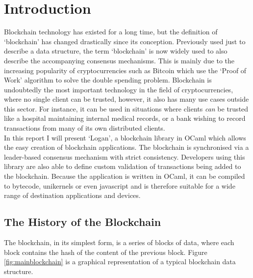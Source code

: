 \documentclass[12pt,a4paper,twoside,openright]{report}
\begin{document}
	\chapter{Introduction}
	Blockchain technology has existed for a long time, but the definition of `blockchain' has changed drastically since its conception.
	Previously used just to describe a data structure, the term `blockchain' is now widely used to also describe the accompanying consensus mechanisms.
	This is mainly due to the increasing popularity of cryptocurrencies such as Bitcoin \cite{Bitcoin} which use the `Proof of Work' algorithm to solve the double spending problem.
	Blockchain is undoubtedly the most important technology in the field of cryptocurrencies, where no single client can be trusted, however, it also has many use cases outside this sector.
	For instance, it can be used in situations where clients \textit{can} be trusted like a hospital maintaining internal medical records, or a bank wishing to record transactions from many of its own distributed clients.\\
	
	In this report I will present `Logan', a blockchain library in OCaml which allows the easy creation of blockchain applications.
	The blockchain is synchronised via a leader-based consensus mechanism with strict consistency.
	Developers using this library are also able to define custom validation of transactions being added to the blockchain.
	Because the application is written in OCaml, it can be compiled to bytecode, unikernels or even javascript and is therefore suitable for a wide range of destination applications and devices.

	\section{The History of the Blockchain}
	The blockchain, in its simplest form, is a series of blocks of data, where each block contains the hash of the content of the previous block. 
	Figure \ref{fig:mainblockchain} is a graphical representation of a typical blockchain data structure.\\
\end{document}
